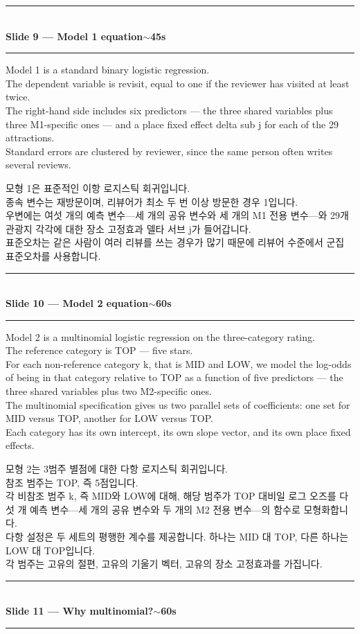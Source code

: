 \documentclass[10pt,a4paper]{article}
\newcommand{\sechead}[2]{%
  \vspace{6pt}%
  \noindent\rule{\linewidth}{0.6pt}\\[1pt]
  {\small\bfseries #1\hfill #2}\\[-3pt]
  \rule{\linewidth}{0.4pt}\par\vspace{2pt}%
}
\newcommand{\sent}[1]{#1\\[5pt]}
\newcommand{\bilingual}[2]{%
  \noindent%
  \begin{minipage}[t]{0.485\linewidth}
    \small #1
  \end{minipage}\hfill\vrule\hfill%
  \begin{minipage}[t]{0.483\linewidth}
    \small #2
  \end{minipage}\par\vspace{4pt}%
}
\begin{document}
\sechead{Slide 9 --- Model 1 equation}{$\sim$45s}

\bilingual{%
\sent{Model 1 is a standard binary logistic regression.}
\sent{The dependent variable is revisit, equal to one if the reviewer
has visited at least twice.}
\sent{The right-hand side includes six predictors --- the three shared
variables plus three M1-specific ones --- and a place fixed effect delta
sub j for each of the 29 attractions.}
\sent{Standard errors are clustered by reviewer, since the same person
often writes several reviews.}
}{%
\sent{모형 1은 표준적인 이항 로지스틱 회귀입니다.}
\sent{종속 변수는 재방문이며, 리뷰어가 최소 두 번 이상 방문한 경우
1입니다.}
\sent{우변에는 여섯 개의 예측 변수---세 개의 공유 변수와 세 개의 M1
전용 변수---와 29개 관광지 각각에 대한 장소 고정효과 델타 서브 j가
들어갑니다.}
\sent{표준오차는 같은 사람이 여러 리뷰를 쓰는 경우가 많기 때문에 리뷰어
수준에서 군집 표준오차를 사용합니다.}
}

\sechead{Slide 10 --- Model 2 equation}{$\sim$60s}

\bilingual{%
\sent{Model 2 is a multinomial logistic regression on the three-category
rating.}
\sent{The reference category is TOP --- five stars.}
\sent{For each non-reference category k, that is MID and LOW, we model
the log-odds of being in that category relative to TOP as a function of
five predictors --- the three shared variables plus two M2-specific ones.}
\sent{The multinomial specification gives us two parallel sets of
coefficients: one set for MID versus TOP, another for LOW versus TOP.}
\sent{Each category has its own intercept, its own slope vector, and its
own place fixed effects.}
}{%
\sent{모형 2는 3범주 별점에 대한 다항 로지스틱 회귀입니다.}
\sent{참조 범주는 TOP, 즉 5점입니다.}
\sent{각 비참조 범주 k, 즉 MID와 LOW에 대해, 해당 범주가 TOP 대비일
로그 오즈를 다섯 개 예측 변수---세 개의 공유 변수와 두 개의 M2 전용
변수---의 함수로 모형화합니다.}
\sent{다항 설정은 두 세트의 평행한 계수를 제공합니다. 하나는 MID 대
TOP, 다른 하나는 LOW 대 TOP입니다.}
\sent{각 범주는 고유의 절편, 고유의 기울기 벡터, 고유의 장소 고정효과를
가집니다.}
}

\sechead{Slide 11 --- Why multinomial?}{$\sim$60s}
\end{document}
